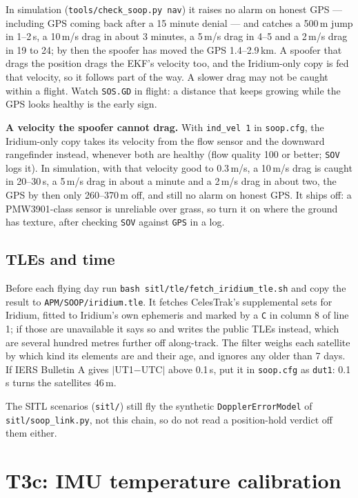 \documentclass[11pt,a4paper]{article}
\newcommand{\file}[1]{\texttt{\small #1}}
\newcommand{\cmd}[1]{\texttt{\small #1}}
\begin{document}
In simulation (\file{tools/check\_soop.py nav}) it raises no alarm on honest GPS ---
including GPS coming back after a 15 minute denial --- and catches a 500\,m jump in 1--2\,s,
a 10\,m/s drag in about 3 minutes, a 5\,m/s drag in 4--5 and a 2\,m/s drag in 19 to 24;
by then the spoofer has moved the GPS 1.4--2.9\,km. A spoofer that drags the position drags
the EKF's velocity too, and the Iridium-only copy is fed that velocity, so it follows part of
the way. A slower drag may not be caught within a flight. Watch \file{SOS.GD} in flight: a
distance that keeps growing while the GPS looks healthy is the early sign.

\textbf{A velocity the spoofer cannot drag.} With \file{ind\_vel 1} in \file{soop.cfg}, the
Iridium-only copy takes its velocity from the flow sensor and the downward rangefinder instead,
whenever both are healthy (flow quality 100 or better; \file{SOV} logs it). In simulation, with
that velocity good to 0.3\,m/s, a 10\,m/s drag is caught in 20--30\,s, a 5\,m/s drag in
about a minute and a 2\,m/s drag in about two, the GPS by then only 260--370\,m off, and
still no alarm on honest GPS. It ships off: a PMW3901-class sensor is unreliable over grass,
so turn it on where the ground has texture, after checking \file{SOV} against \file{GPS}
in a log.

\subsection{TLEs and time}

Before each flying day run \cmd{bash sitl/tle/fetch\_iridium\_tle.sh} and copy the result to
\file{APM/SOOP/iridium.tle}. It fetches CelesTrak's supplemental sets for Iridium, fitted to
Iridium's own ephemeris and marked by a \file{C} in column 8 of line 1; if those are
unavailable it says so and writes the public TLEs instead, which are several hundred metres
further off along-track. The filter weighs each satellite by which kind its elements are and
their age, and ignores any older than 7 days. If IERS Bulletin A gives $|$UT1$-$UTC$|$ above 0.1\,s, put it
in \file{soop.cfg} as \file{dut1}: 0.1\,s turns the satellites 46\,m.

The SITL scenarios (\file{sitl/}) still fly the synthetic \file{DopplerErrorModel} of
\file{sitl/soop\_link.py}, not this chain, so do not read a position-hold verdict off them
either.

\section{T3c: IMU temperature calibration}
\end{document}
